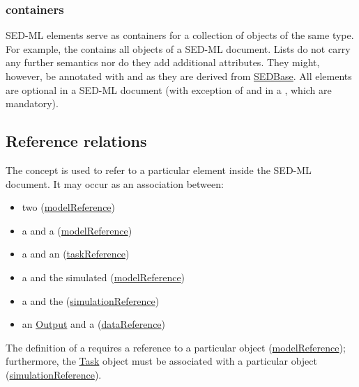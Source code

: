\subsubsection{ containers}
\label{class:listOf}
SED-ML  elements serve as containers for a collection of objects of the same type. For example, the \hyperref[class:listOfModels]{} contains all \Model objects of a SED-ML document. Lists do not carry any further semantics nor do they add additional attributes. They might, however, be annotated with \Notes and \Annotation as they are derived from \hyperref[class:sedBase]{SEDBase}. All  elements are optional in a SED-ML document (with exception of \hyperref[class:listOfRanges]{} and \hyperref[class:subTask]{} in a \RepeatedTask, which are mandatory).


\subsection{Reference relations}
\label{sec:reference}

The  concept is used to refer to a particular element inside the SED-ML document. It may occur as an association between:

\begin{itemize}
	\item{two \Models (\hyperref[sec:modelReference]{modelReference})}
	\item{a \Variable and a \Model (\hyperref[sec:modelReference]{modelReference})}
	\item{a \Variable and an \AbstractTask (\hyperref[sec:taskReference]{taskReference})}
	\item{a \Task and the simulated \Model (\hyperref[sec:modelReference]{modelReference})}
	\item{a \Task and the \Simulation (\hyperref[sec:simulationReference]{simulationReference})}
	\item{an \hyperref[class:output]{Output} and a \DataGenerator (\hyperref[sec:dataReference]{dataReference})}
\end{itemize}

The definition of a \Task requires a reference to a particular \Model object (\hyperref[sec:modelReference]{modelReference}); furthermore, the \hyperref[class:abstractTask]{Task} object must be associated with a particular \Simulation object (\hyperref[sec:simulationReference]{simulationReference}).

